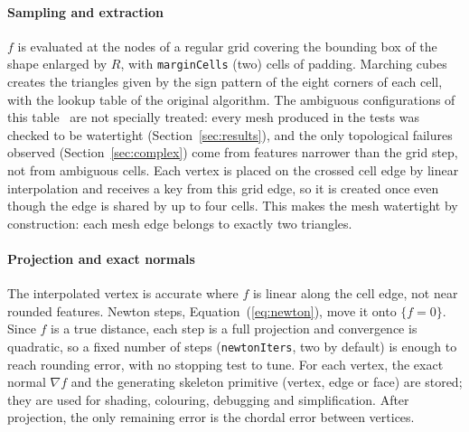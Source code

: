 \documentclass[11pt,a4paper]{article}
\newcommand{\Rmink}{R}                 %
\newcommand{\sdf}{f}                   %
\newcommand{\code}[1]{\texttt{#1}}
\begin{document}
\paragraph{Sampling and extraction} $\sdf$ is evaluated at the nodes of a regular
grid covering the bounding box of the shape enlarged by $\Rmink$, with
\code{marginCells} (two) cells of padding. Marching cubes creates the triangles
given by the sign pattern of the eight corners of each cell, with the lookup
table of the original algorithm. The ambiguous configurations of this
table~\cite{nielson1991,lewiner2003,newman2006} are not specially treated: every
mesh produced in the tests was checked to be watertight
(Section~\ref{sec:results}), and the only topological failures observed
(Section~\ref{sec:complex}) come from features narrower than the grid step, not
from ambiguous cells. Each vertex is placed on the crossed cell edge by linear
interpolation and receives a key from this grid edge, so it is created once even
though the edge is shared by up to four cells. This makes the mesh watertight by
construction: each mesh edge belongs to exactly two triangles.

\paragraph{Projection and exact normals} The interpolated vertex is accurate where
$\sdf$ is linear along the cell edge, not near rounded features. Newton steps,
Equation~(\ref{eq:newton}), move it onto $\{\sdf=0\}$. Since $\sdf$ is a true
distance, each step is a full projection and convergence is quadratic, so a fixed
number of steps (\code{newtonIters}, two by default) is enough to reach rounding
error, with no stopping test to tune. For each vertex, the exact normal
$\nabla\sdf$ and the generating skeleton primitive (vertex, edge or face) are
stored; they are used for shading, colouring, debugging and simplification. After
projection, the only remaining error is the chordal error between vertices.
\end{document}
